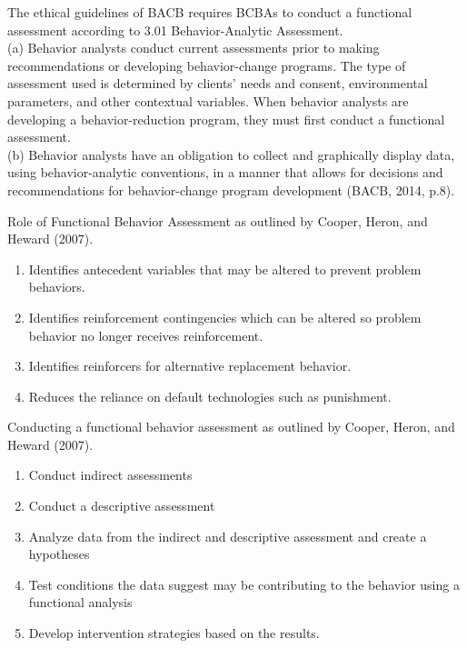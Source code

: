 The ethical guidelines of BACB requires BCBAs to conduct a functional assessment according to 3.01 Behavior-Analytic Assessment. \\
(a) Behavior analysts conduct current assessments prior to making recommendations or developing behavior-change programs. The type of assessment used is determined by clients' needs and consent, environmental parameters, and other contextual variables. When behavior analysts are developing a behavior-reduction program, they must first conduct a functional assessment.\\
(b) Behavior analysts have an obligation to collect and graphically display data, using behavior-analytic conventions, in a manner that allows for decisions and recommendations for behavior-change program development (BACB, 2014, p.8).

Role of Functional Behavior Assessment as outlined by Cooper, Heron, and Heward (2007).
\begin{enumerate}
\item Identifies antecedent variables that may be altered to prevent problem behaviors.
\item Identifies reinforcement contingencies which can be altered so problem behavior no longer receives reinforcement.
\item Identifies reinforcers for alternative replacement behavior.
\item Reduces the reliance on default technologies such as punishment.
\end{enumerate}

Conducting a functional behavior assessment as outlined by Cooper, Heron, and Heward (2007).
\begin{enumerate}
\item Conduct indirect assessments
\item Conduct a descriptive assessment
\item Analyze data  from the indirect and descriptive assessment and create a hypotheses 
\item Test conditions the data suggest may be contributing to the behavior using a functional analysis
\item Develop intervention strategies based on the results.
\end{enumerate}
%
